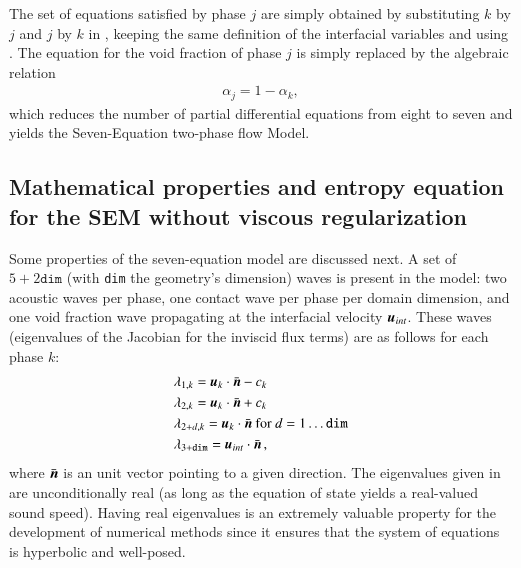 \documentclass[preprint,10pt]{elsarticle}
\begin{document}

The set of equations satisfied by phase $j$ are simply obtained by substituting $k$ by $j$ and $j$ by $k$ in , keeping the same definition of the interfacial variables and using . The equation for the void fraction of phase $j$ is simply replaced by the algebraic relation
%
\begin{align}
 \alpha_{j}= 1 - \alpha_{k}, \nonumber
\end{align}
%
which reduces the number of partial differential equations from eight to seven and yields the Seven-Equation two-phase flow Model. 
\subsection{Mathematical properties and entropy equation for the SEM without viscous regularization}\label{eq:sem-ent-wv}
Some properties of the seven-equation model are discussed next. A set of $5+2\texttt{dim}$ (with \texttt{dim} the geometry's dimension) waves is present in the model: two acoustic waves per phase, one contact wave per phase per domain dimension, and one void fraction wave propagating at the interfacial velocity $\boldsymbol u_{int}$. These waves (eigenvalues of the Jacobian for the inviscid flux terms) are as follows for each phase $k$:
% 
\begin{align}\label{eq:eigenvalues}
&\lambda_{1,k} = \boldsymbol u_k \cdot \bar{\boldsymbol n} - c_k \nonumber\\
&\lambda_{2,k} = \boldsymbol u_k \cdot \bar{\boldsymbol n} + c_k \nonumber\\
&\lambda_{2+d,k} = \boldsymbol u_k \cdot \bar{\boldsymbol n} \text{ for } d = 1 \dots \texttt{dim} \\
&\lambda_{3+\texttt{dim}} = \boldsymbol u_{int} \cdot \bar{\boldsymbol n} \nonumber \,,
\end{align}
%
where $\bar{\boldsymbol n}$ is an unit vector pointing to a given direction. The eigenvalues given in  are unconditionally real (as long as the equation of state yields a real-valued sound speed). Having real eigenvalues is an extremely valuable property for the development of numerical methods since it ensures that the system of equations is hyperbolic and well-posed. 
\end{document}
